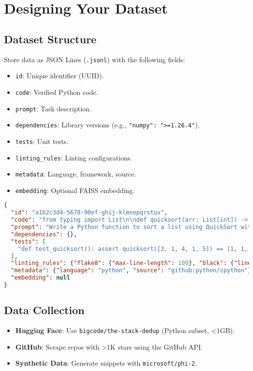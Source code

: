 \documentclass[12pt]{article}
\begin{document}
\section{Designing Your Dataset}
\subsection{Dataset Structure}
Store data as JSON Lines (\texttt{.jsonl}) with the following fields:
\begin{itemize}
  \item \texttt{id}: Unique identifier (UUID).
  \item \texttt{code}: Verified Python code.
  \item \texttt{prompt}: Task description.
  \item \texttt{dependencies}: Library versions (e.g., \texttt{"numpy": ">=1.26.4"}).
  \item \texttt{tests}: Unit tests.
  \item \texttt{linting\_rules}: Linting configurations.
  \item \texttt{metadata}: Language, framework, source.
  \item \texttt{embedding}: Optional FAISS embedding.
\end{itemize}

\begin{lstlisting}[language=JSON, caption=Sample Data Point]
{
  "id": "a1b2c3d4-5678-90ef-ghij-klmnopqrstuv",
  "code": "from typing import List\n\ndef quicksort(arr: List[int]) -> List[int]:\n    if len(arr) <= 1:\n        return arr\n    pivot = arr[len(arr) // 2]\n    left = [x for x in arr if x < pivot]\n    middle = [x for x in arr if x == pivot]\n    right = [x for x in arr if x > pivot]\n    return quicksort(left) + middle + quicksort(right)",
  "prompt": "Write a Python function to sort a list using QuickSort with type hints.",
  "dependencies": {},
  "tests": [
    "def test_quicksort(): assert quicksort([3, 1, 4, 1, 5]) == [1, 1, 3, 4, 5]"
  ],
  "linting_rules": {"flake8": {"max-line-length": 100}, "black": {"line-length": 88}},
  "metadata": {"language": "python", "source": "github:python/cpython"},
  "embedding": null
}
\end{lstlisting}

\subsection{Data Collection}
\begin{itemize}
  \item \textbf{Hugging Face}: Use \texttt{bigcode/the-stack-dedup} (Python subset, <1GB).
  \item \textbf{GitHub}: Scrape repos with >1K stars using the GitHub API.
  \item \textbf{Synthetic Data}: Generate snippets with \texttt{microsoft/phi-2}.
\end{itemize}
\end{document}
